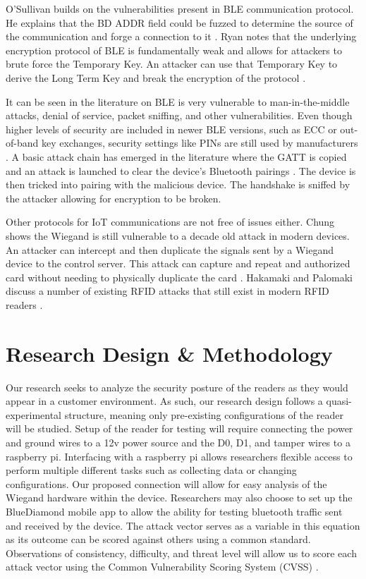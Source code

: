 \documentclass[10pt,twocolumn,letterpaper]{article}
\begin{document}
O'Sullivan builds on the vulnerabilities present in BLE communication protocol. He explains that the BD ADDR field could be fuzzed to determine the source of the communication and forge a connection to it \cite{osullivan}. Ryan notes that the underlying encryption protocol of BLE is fundamentally weak and allows for attackers to brute force the Temporary Key. An attacker can use that Temporary Key to derive the Long Term Key and break the encryption of the protocol \cite{mryan13}.

It can be seen in the literature on BLE is very vulnerable to man-in-the-middle attacks, denial of service, packet sniffing, and other vulnerabilities. Even though higher levels of security are included in newer BLE versions, such as ECC or out-of-band key exchanges, security settings like PINs are still used by manufacturers \cite{8622000}\cite{jaihc19}\cite{mryan13}. A basic attack chain has emerged in the literature where the GATT is copied and an attack is launched to clear the device's Bluetooth pairings \cite{jaihc19}. The device is then tricked into pairing with the malicious device. The handshake is sniffed by the attacker allowing for encryption to be broken.

Other protocols for IoT communications are not free of issues either. Chung shows the Wiegand is still vulnerable to a decade old attack in modern devices. An attacker can intercept and then duplicate the signals sent by a Wiegand device to the control server. This attack can capture and repeat and authorized card without needing to physically duplicate the card \cite{chung2017wiegand}. Hakamaki and Palomaki discuss a number of existing RFID attacks that still exist in modern RFID readers \cite{rfid15}.

\section{Research Design \& Methodology}
Our research seeks to analyze the security posture of the readers as they would appear in a customer environment. As such, our research design follows a quasi-experimental structure, meaning only pre-existing configurations of the reader will be studied. Setup of the reader for testing will require connecting the power and ground wires to a 12v power source and the D0, D1, and tamper wires to a raspberry pi. Interfacing with a raspberry pi allows researchers flexible access to perform multiple different tasks such as collecting data or changing configurations. Our proposed connection will allow for easy analysis of the Wiegand hardware within the device. Researchers may also choose to set up the BlueDiamond mobile app to allow the ability for testing bluetooth traffic sent and received by the device. The attack vector serves as a variable in this equation as its outcome can be scored against others using a common standard. Observations of consistency, difficulty, and threat level will allow us to score each attack vector using the Common Vulnerability Scoring System (CVSS) \cite{cvss}.
\end{document}
